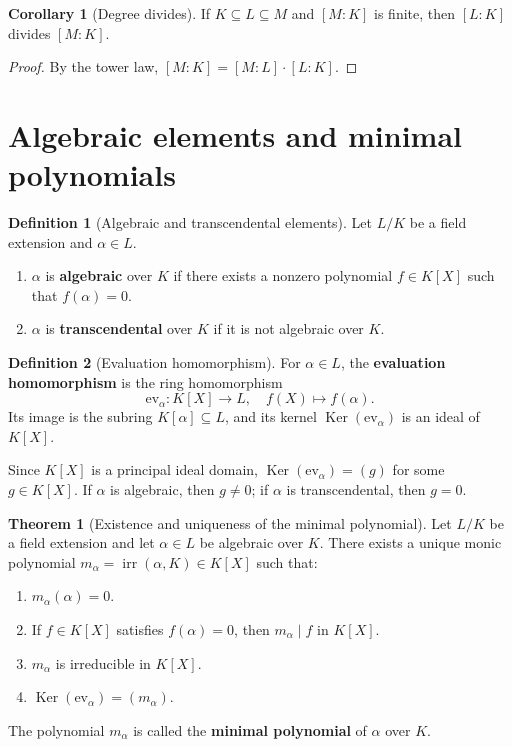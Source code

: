 \documentclass[12pt,a4paper,openany]{book}
\theoremstyle{definition}
\newtheorem{definition}{Definition}[chapter]
\newtheorem{theorem}{Theorem}[chapter]
\newtheorem{corollary}{Corollary}[chapter]
\theoremstyle{remark}
\DeclareMathOperator{\Ker}{Ker}
\DeclareMathOperator{\irr}{irr}
\begin{document}
\begin{corollary}[Degree divides]
\label{cor:degree-divides}
If $K \subseteq L \subseteq M$ and $[M:K]$ is finite, then $[L:K]$
divides $[M:K]$.
\end{corollary}

\begin{proof}
By the tower law, $[M:K] = [M:L]\cdot[L:K]$.
\end{proof}

\section{Algebraic elements and minimal polynomials}
\label{sec:algebraic-elements}

\begin{definition}[Algebraic and transcendental elements]
\label{def:algebraic-element}
Let $L/K$ be a field extension and $\alpha \in L$.
\begin{enumerate}[label=(\roman*)]
  \item $\alpha$ is \textbf{algebraic} over $K$ if there exists a
    nonzero polynomial $f \in K[X]$ such that $f(\alpha) = 0$.
  \item $\alpha$ is \textbf{transcendental} over $K$ if it is not
    algebraic over $K$.
\end{enumerate}
\end{definition}

\begin{definition}[Evaluation homomorphism]
\label{def:eval-hom}
For $\alpha \in L$, the \textbf{evaluation homomorphism} is the ring
homomorphism
\[
  \mathrm{ev}_\alpha \colon K[X] \longrightarrow L, \quad
  f(X) \longmapsto f(\alpha).
\]
Its image is the subring $K[\alpha] \subseteq L$, and its kernel
$\Ker(\mathrm{ev}_\alpha)$ is an ideal of $K[X]$.
\end{definition}

Since $K[X]$ is a principal ideal domain,
$\Ker(\mathrm{ev}_\alpha) = (g)$ for some $g \in K[X]$. If $\alpha$
is algebraic, then $g \ne 0$; if $\alpha$ is transcendental, then
$g = 0$.

\begin{theorem}[Existence and uniqueness of the minimal polynomial]
\label{thm:minimal-poly}
Let $L/K$ be a field extension and let $\alpha \in L$ be algebraic
over $K$. There exists a unique monic polynomial
$m_\alpha = \irr(\alpha, K) \in K[X]$ such that:
\begin{enumerate}[label=(\roman*)]
  \item $m_\alpha(\alpha) = 0$.
  \item If $f \in K[X]$ satisfies $f(\alpha) = 0$, then $m_\alpha
    \mid f$ in $K[X]$.
  \item $m_\alpha$ is irreducible in $K[X]$.
  \item $\Ker(\mathrm{ev}_\alpha) = (m_\alpha)$.
\end{enumerate}
The polynomial $m_\alpha$ is called the \textbf{minimal polynomial}
of $\alpha$ over $K$.
\end{theorem}
\end{document}
